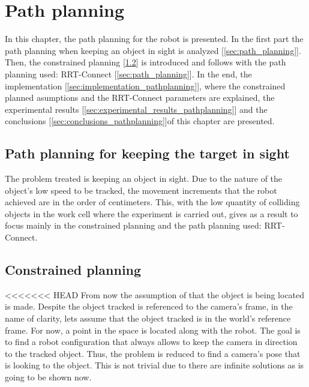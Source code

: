\chapter{Path planning} %
\label{chap:path_planning}

In this chapter, the path planning for the robot is presented.
In the first part the path planning when keeping an object in sight is analyzed [\ref{sec:path_planning}]. Then, the constrained planning [\ref{sec:constrained_planning}] is introduced and follows with the path planning used: RRT-Connect [\ref{sec:path_planning}]. In the end, the implementation [\ref{sec:implementation_pathplanning}], where the constrained planned asumptions and the RRT-Connect parameters are explained, the experimental results [\ref{sec:experimental_results_pathplanning}] and the conclusions [\ref{sec:conclusions_pathplanning}]of this chapter are presented.

\section{Path planning for keeping the target in sight} %
\label{sec:path_planning_in_keep_object_in_sight}
The problem treated is keeping an object in sight. 
Due to the nature of the object's low speed to be tracked, the movement increments that the robot achieved are in the order of centimeters. 
This, with the low quantity of colliding objects in the work cell where the experiment is carried out, gives as a result to focus mainly in the constrained planning and the path planning used: RRT-Connect.

\section{Constrained planning} %
\label{sec:constrained_planning}
<<<<<<< HEAD
From now the assumption of that the object is being located is made. 
Despite the object tracked is referenced to the camera's frame, in the name of clarity, lets assume that the object tracked is in the world's reference frame. 
For now, a point in the space is located along with the robot.
The goal is to find a robot configuration that always allows to keep the camera in direction to the tracked object.
Thus, the problem is reduced to find a camera's pose that is looking to the object.
This is not trivial due to there are infinite solutions as is going to be shown now. \\

